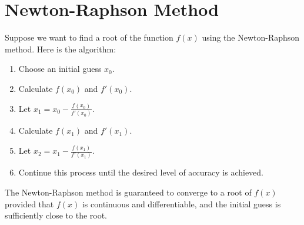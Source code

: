 \documentclass{article}
\begin{document}
\section{Newton-Raphson Method}

Suppose we want to find a root of the function $f(x)$ using the Newton-Raphson method. Here is the algorithm:

\begin{enumerate}
\item Choose an initial guess $x_0$.
\item Calculate $f(x_0)$ and $f'(x_0)$.
\item Let $x_1 = x_0 - \frac{f(x_0)}{f'(x_0)}$.
\item Calculate $f(x_1)$ and $f'(x_1)$.
\item Let $x_2 = x_1 - \frac{f(x_1)}{f'(x_1)}$.
\item Continue this process until the desired level of accuracy is achieved.
\end{enumerate}

The Newton-Raphson method is guaranteed to converge to a root of $f(x)$ provided that $f(x)$ is continuous and differentiable, and the initial guess is sufficiently close to the root.
\end{document}
